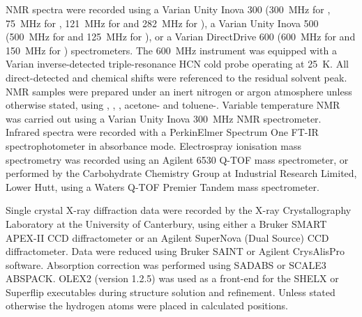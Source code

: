 NMR spectra were recorded using a Varian Unity Inova 300 (300~MHz for \proton, 75~MHz for \carbon, 121~MHz for \phosphorus{} and 282~MHz for \fluorine), a Varian Unity Inova 500 (500~MHz for \proton{} and 125~MHz for \carbon), or a Varian DirectDrive 600 (600~MHz for \proton and 150~MHz for \carbon{}) spectrometers.   The 600~MHz instrument was equipped with a Varian inverse-detected triple-resonance HCN cold probe operating at 25~K.  All direct-detected \proton{} and \carbon{} chemical shifts were referenced to the residual solvent peak.\cite{Fulmer2010}  NMR samples were prepared under an inert nitrogen or argon atmosphere unless otherwise stated, using , , , acetone- and toluene-.  Variable temperature NMR was carried out using a Varian Unity Inova 300~MHz NMR spectrometer.  Infrared spectra were recorded with a PerkinElmer Spectrum One FT-IR spectrophotometer in absorbance mode.  Electrospray ionisation mass spectrometry was recorded using an Agilent 6530 Q-TOF mass spectrometer, or performed by the Carbohydrate Chemistry Group at Industrial Research Limited, Lower Hutt, using a Waters Q-TOF Premier Tandem mass spectrometer.

Single crystal X-ray diffraction data were recorded by the X-ray Crystallography Laboratory at the University of Canterbury, using either a Bruker SMART APEX-II CCD diffractometer or an Agilent SuperNova (Dual Source) CCD diffractometer.  Data were reduced using Bruker SAINT or Agilent CrysAlisPro software.  Absorption correction was performed using SADABS or SCALE3 ABSPACK.  OLEX2 (version 1.2.5)\cite{Olex2} was used as a front-end for the SHELX\cite{Shelx} or Superflip\cite{Superflip} executables during structure solution and refinement.  Unless stated otherwise the hydrogen atoms were placed in calculated positions.


